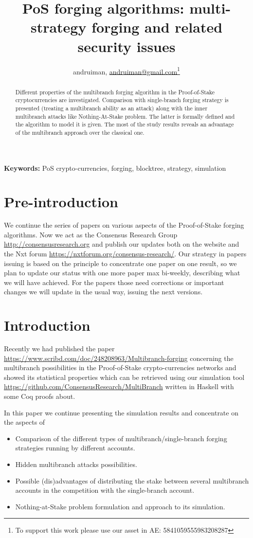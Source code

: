 \documentclass[12pt]{article}
\author{andruiman, \href{maito: andruiman@gmail.com}{andruiman@gmail.com}\footnote{To support this work please use our asset in AE: 5841059555983208287}}
\title{PoS forging algorithms: multi-strategy forging and related security issues}
\begin{document}
\maketitle
\begin{abstract}
Different properties of the multibranch forging algorithm in the Proof-of-Stake cryptocurrencies are investigated. Comparison with single-branch
forging strategy is presented (treating a multibranch ability as an attack) along with the inner multibranch attacks like Nothing-At-Stake problem.
The latter is formally defined and the algorithm to model it is given. The most of the study results reveals an advantage of the multibranch approach
over the classical one.   
\end{abstract}

\noindent
{\bf Keywords:} PoS crypto-currencies, forging, blocktree, strategy, simulation

\section{Pre-introduction}

We continue the series of papers on various aspects of the Proof-of-Stake forging algorithms. Now we act as the Consensus Research 
Group \url{http://consensusresearch.org} and publish our updates both on the website and the Nxt forum \url{https://nxtforum.org/consensus-research/}.
Our strategy in papers issuing is based on the principle to concentrate one paper on one result, so we plan to update our status with one more paper 
max bi-weekly, describing what we will have achieved. For the papers those need corrections or important changes we will update in the usual way,
issuing the next versions. 

\section{Introduction}

Recently we had published the paper \url{https://www.scribd.com/doc/248208963/Multibranch-forging} concerning the multibranch possibilities 
in the Proof-of-Stake crypto-currencies networks and showed its statistical properties which can be retrieved using our simulation tool 
\url{https://github.com/ConsensusResearch/MultiBranch} written in Haskell with some Coq proofs about. 

In this paper we continue presenting the simulation results and concentrate on the aspects of
\begin{itemize}
\item[1.] {Comparison of the different types of multibranch/single-branch forging strategies running by different accounts.}
\item[2.] {Hidden multibranch attacks possibilities.}
\item[3.] {Possible (dis)advantages of distributing the stake between several multibranch accounts in the competition with the single-branch account.}
\item[3.] {Nothing-at-Stake problem formulation and approach to its simulation.}
\end{itemize}
\end{document}
